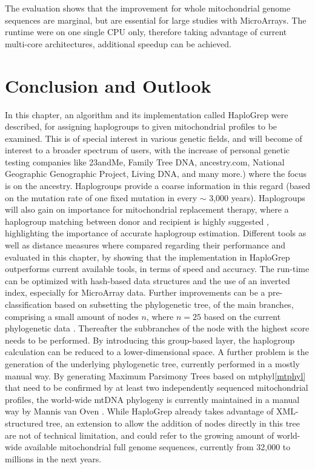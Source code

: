The evaluation shows that the improvement for whole mitochondrial genome sequences are marginal, but are essential for large studies with MicroArrays. The runtime were on one single CPU only, therefore taking advantage of current multi-core architectures, additional speedup can be achieved. 

\section{Conclusion and Outlook}\label{hg:outlook}
In this chapter, an algorithm and its implementation called HaploGrep were described, for assigning haplogroups to given mitochondrial profiles to be examined. This is of special interest in various genetic fields, and will become of interest to a broader spectrum of users, with the increase of personal genetic testing companies like 23andMe, Family Tree DNA, ancestry.com, National Geographic Genographic Project, Living DNA, and many more.) where the focus is on the ancestry. Haplogroups provide a coarse information in this regard (based on the mutation rate of one fixed mutation in every $\sim$ 3,000 years). Haplogroups will also gain on importance for mitochondrial replacement therapy, where a haplogroup matching between donor and recipient is highly suggested \cite{Royrvik2016}, highlighting the importance of accurate haplogroup estimation. Different tools as well as distance measures where compared regarding their performance and evaluated in this chapter, by showing that the implementation in HaploGrep outperforms current available tools, in terms of speed and accuracy. The run-time can be optimized with hash-based data structures and the use of an inverted index, especially for MicroArray data. Further improvements can be a pre-classification based on subsetting the phylogenetic tree, of the main branches, comprising a small amount of nodes $n$, where $n = 25$ based on the current phylogenetic data \cite{VanOven2015}. Thereafter the subbranches of the node with the highest score needs to be performed. By introducing this group-based layer, the haplogroup calculation can be reduced to a lower-dimensional space. A further problem is the generation of the underlying phylogenetic tree, currently performed in a mostly manual way. By generating Maximum Parsimony Trees based on mtphyl\ref{mtphyl} that need to be confirmed by at least two independently sequenced mitochondrial profiles, the world-wide mtDNA phylogeny is currently maintained in a manual way by Mannis van Oven \cite{VanOven2015}. While HaploGrep already takes advantage of XML-structured tree, an extension to allow the addition of nodes directly in this tree are not of technical limitation, and could refer to the growing amount of world-wide available mitochondrial full genome sequences, currently from 32,000 to millions in the next years.
